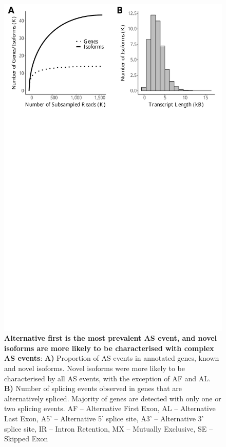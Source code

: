 \vspace{1cm}
\begin{figure}[!h]
	\begin{center}
		\includegraphics[page=5,trim={0 26cm 0 0},clip,scale = 0.55]{Figures/IsoSeqWholeTranscriptome.pdf}
	\end{center}
	\captionsetup{width=0.95\textwidth}
	\caption[Number of Alternative Splicing Events in Whole Transcriptome Iso-Seq]%
	{\textbf{Alternative first is the most prevalent AS event, and novel isoforms are more likely to be characterised with complex AS events}: \textbf{A)} Proportion of AS events in annotated genes, known and novel isoforms. Novel isoforms were more likely to be characterised by all AS events, with the exception of AF and AL. \textbf{B)} Number of splicing events observed in genes that are alternatively spliced. Majority of genes are detected with only one or two splicing events. AF – Alternative First Exon, AL – Alternative Last Exon, A5’ – Alternative 5’ splice site, A3’ – Alternative 3’ splice site, IR – Intron Retention, MX – Mutually Exclusive, SE – Skipped Exon}
	\label{fig:isoseq_whole_As_events}
\end{figure}

